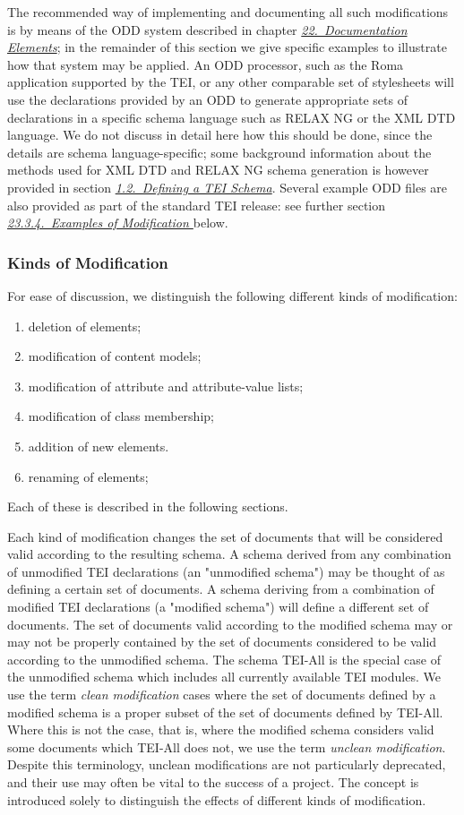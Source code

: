 The recommended way of implementing and documenting all such modifications is by means of the ODD system described in chapter \textit{\hyperref[TD]{22.\ Documentation Elements}}; in the remainder of this section we give specific examples to illustrate how that system may be applied. An ODD processor, such as the Roma application supported by the TEI, or any other comparable set of stylesheets will use the declarations provided by an ODD to generate appropriate sets of declarations in a specific schema language such as RELAX NG or the XML DTD language. We do not discuss in detail here how this should be done, since the details are schema language-specific; some background information about the methods used for XML DTD and RELAX NG schema generation is however provided in section \textit{\hyperref[STIN]{1.2.\ Defining a TEI Schema}}. Several example ODD files are also provided as part of the standard TEI release: see further section \textit{\hyperref[MDlite]{23.3.4.\ Examples of Modification }} below.
\subsubsection[{Kinds of Modification}]{Kinds of Modification}\label{MDMD}\par
For ease of discussion, we distinguish the following different kinds of modification: \begin{enumerate}
\item deletion of elements;
\item modification of content models;
\item modification of attribute and attribute-value lists;
\item modification of class membership;
\item addition of new elements.
\item renaming of elements;
\end{enumerate} Each of these is described in the following sections.\par
Each kind of modification changes the set of documents that will be considered valid according to the resulting schema. A schema derived from any combination of unmodified TEI declarations (an "unmodified schema") may be thought of as defining a certain set of documents. A schema deriving from a combination of modified TEI declarations (a "modified schema") will define a different set of documents. The set of documents valid according to the modified schema may or may not be properly contained by the set of documents considered to be valid according to the unmodified schema. The schema \textsf{TEI-All} is the special case of the unmodified schema which includes all currently available TEI modules. We use the term \textit{clean modification} cases where the set of documents defined by a modified schema is a proper subset of the set of documents defined by TEI-All. Where this is not the case, that is, where the modified schema considers valid some documents which TEI-All does not, we use the term \textit{unclean modification}. Despite this terminology, unclean modifications are not particularly deprecated, and their use may often be vital to the success of a project. The concept is introduced solely to distinguish the effects of different kinds of modification.
